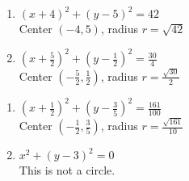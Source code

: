 \documentclass{ximera}
\begin{document}
\begin{multicols}{2}
\begin{enumerate}
\setcounter{enumi}{\value{HW}}

\item $(x+4)^2 + (y-5)^2 = 42$ \\
Center $(-4,5)$, radius $r = \sqrt{42}$

\item $\left(x + \frac{5}{2}\right)^2 + \left(y - \frac{1}{2}\right)^2 = \frac{30}{4}$ \\
Center $\left( -\frac{5}{2}, \frac{1}{2}\right)$, radius $r = \frac{\sqrt{30}}{2}$

\setcounter{HW}{\value{enumi}}
\end{enumerate}
\end{multicols}

\begin{multicols}{2}
\begin{enumerate}
\setcounter{enumi}{\value{HW}}

\item $\left(x + \frac{1}{2}\right)^{2} + \left(y - \frac{3}{5}\right)^{2} = \frac{161}{100}$\\
Center $\left(-\frac{1}{2}, \frac{3}{5}\right)$, radius $r = \frac{\sqrt{161}}{10}$

\item $x^{2} + (y - 3)^{2} = 0$\\
This is not a circle.

\setcounter{HW}{\value{enumi}}
\end{enumerate}
\end{multicols}
\end{document}
